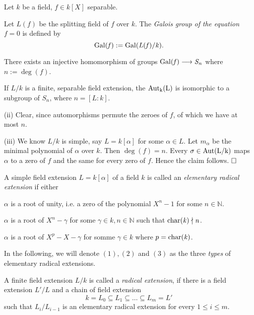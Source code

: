 \documentclass[11pt]{book}
\theoremstyle{nonumberbreak}
\newenvironment{defin}[1][]{\ifthenelse{\equal{#1}{}}{\definition}{\definition[#1]}\rm}{\enddefinition}
\newenvironment{pr}[1][]{\ifthenelse{\equal{#1}{}}{\proof}{\proof[#1]}\rm}{\endproof}
\newenvironment{definbem}[1][]{\ifthenelse{\equal{#1}{}}{\definibem}{\definibem[#1]}\rm}{\enddefinibem}
\begin{document}
\begin{spacing}{1.3}
\begin{definbem} %
Let $k$ be a field, $f \in k[X]$ separable.
\begin{compactenum}
\item Let $L(f)$ be the splitting field of $f$ over $k$. The \textit{Galois group of the equation }$f=0$ is defined by
$$ \rm{Gal}\it(f):=\rm{Gal}\it(L(f)/k).$$
\item There exists an injective homomorphism of groups $\rm{Gal}\it(f)\longrightarrow S_n$ where $n:= \deg(f)$.
\item If $L/k$ is a finite, separable field extension, the $\rm{Aut}_{k}(L)$ is isomorphic to a subgroup of $S_n$, where $n= [L:k]$.
\end{compactenum}
\begin{pr}
\begin{compactenum}
\item[(ii)] Clear, since automorphisms permute the zeroes of $f$, of which we have at most $n$.
\item[(iii)] We know $L/k$ is simple, say $L=k[\alpha]$ for some $\alpha \in L$. Let $m_{\alpha}$ be the minimal polynomial of $\alpha$ over $k$. Then $\deg(f)=n$. Every $\sigma \in \rm{Aut}(L/k)$ maps $\alpha$ to a zero of $f$ and the same for every zero of $f$. Hence the claim follows. $\hfill \Box$

\end{compactenum}
\end{pr}
\end{definbem}


\begin{defin} %
\begin{compactenum}
\item A simple field extension $L=k[\alpha]$ of a field $k$ is called an \textit{elementary radical extension} if either
\begin{compactenum}
\item $\alpha$ is a root of unity, i.e. a zero of the polynomial $X^n-1$ for some $n \in \mathbb{N}$.
\item $\alpha$ is a root of $X^n- \gamma$ for some $\gamma \in k, n \in \mathbb{N}$ such that $\rm{char}\it(k) \nmid n$.
\item $\alpha$ is a root of $X^p-X-\gamma$ for somme $\gamma \in k$ where $p=\rm{char}\it(k)$.
\end{compactenum}
In the following, we will denote $(1), (2)$ and $(3)$ as the three \textit{types} of elementary radical extensions.
\item  A finite field extension $L/k$ is called a \textit{radical extension}, if there is a field extension $L'/L$ and a chain of field extension 
$$ k=L_0 \subseteq L_1 \subseteq \dots \subseteq L_m = L'$$
such that $L_i/L_{i-1}$ is an elementary radical extension for every $1 \leqslant i \leqslant m$.
\end{compactenum}
\end{defin}


\end{spacing}
\end{document}
